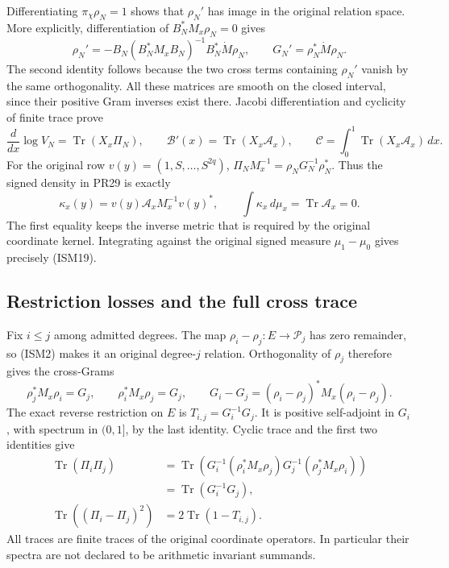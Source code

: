 Differentiating \(\pi_\chi\rho_N=1\) shows that \(\rho_N'\)
has image in the original relation space.  More explicitly,
differentiation of \(B_N^*M_x\rho_N=0\) gives
\[
 \rho_N'=-B_N(B_N^*M_xB_N)^{-1}B_N^*\dot M\rho_N,\qquad
 G_N'=\rho_N^*\dot M\rho_N.
 \tag{ISM18}
\]
The second identity follows because the two cross terms
containing \(\rho_N'\) vanish by the same orthogonality.
All these matrices are smooth on the closed interval,
since their positive Gram inverses exist there.
Jacobi differentiation and cyclicity of finite trace prove
\[
 \frac{d}{dx}\log V_N=\operatorname{Tr}(X_x\Pi_N),\qquad
 \mathcal B'(x)=\operatorname{Tr}(X_x\mathcal A_x),\qquad
 \mathcal C=\int_0^1\operatorname{Tr}(X_x\mathcal A_x)\,dx.
 \tag{ISM19}
\]
For the original row \(v(y)=(1,S,\ldots,S^{2q})\),
\(\Pi_NM_x^{-1}=\rho_NG_N^{-1}\rho_N^*\).  Thus the
signed density in PR29 is exactly
\[
 \kappa_x(y)=v(y)\mathcal A_xM_x^{-1}v(y)^*,\qquad
 \int\kappa_x\,d\mu_x=\operatorname{Tr}\mathcal A_x=0.
 \tag{ISM20}
\]
The first equality keeps the inverse metric that is
required by the original coordinate kernel.  Integrating
against the original signed measure \(\mu_1-\mu_0\)
gives precisely (ISM19).

\subsection{Restriction losses and the full cross trace}

Fix \(i\leq j\) among admitted degrees.  The map
\(\rho_i-\rho_j:E\to\mathcal P_j\) has zero remainder,
so (ISM2) makes it an original degree-\(j\) relation.
Orthogonality of \(\rho_j\) therefore gives the cross-Grams
\[
 \rho_j^*M_x\rho_i=G_j,\qquad
 \rho_i^*M_x\rho_j=G_j,\qquad
 G_i-G_j=(\rho_i-\rho_j)^*M_x(\rho_i-\rho_j).
 \tag{ISM21}
\]
The exact reverse restriction on \(E\) is
\(T_{i,j}=G_i^{-1}G_j\).  It is positive self-adjoint
in \(G_i\), with spectrum in \((0,1]\), by the last
identity.  Cyclic trace and the first two identities give
\[
 \begin{split}
 \operatorname{Tr}(\Pi_i\Pi_j)
 &=\operatorname{Tr}
 (G_i^{-1}(\rho_i^*M_x\rho_j)G_j^{-1}
                  (\rho_j^*M_x\rho_i))\\
 &=\operatorname{Tr}(G_i^{-1}G_j),\\
 \operatorname{Tr}((\Pi_i-\Pi_j)^2)
 &=2\operatorname{Tr}(1-T_{i,j}).
 \end{split}
 \tag{ISM22}
\]
All traces are finite traces of the original coordinate
operators.  In particular their spectra are not declared
to be arithmetic invariant summands.

